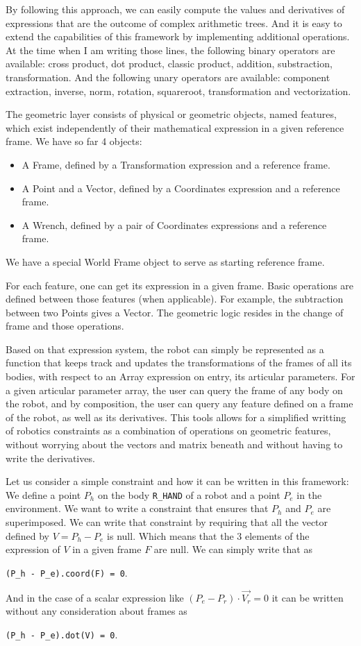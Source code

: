 By following this approach, we can easily compute the values and derivatives of expressions that are the outcome of complex arithmetic trees.
And it is easy to extend the capabilities of this framework by implementing additional operations.
At the time when I am writing those lines, the following binary operators are available: cross product, dot product, classic product, addition, substraction, transformation.
And the following unary operators are available: component extraction, inverse, norm, rotation, squareroot, transformation and vectorization.

The geometric layer consists of physical or geometric objects, named features, which exist independently of their mathematical expression in a given reference frame.
We have so far 4 objects:
\begin{itemize}
  \item A Frame, defined by a Transformation expression and a reference frame.
  \item A Point and a Vector, defined by a Coordinates expression and a reference frame.
  \item A Wrench, defined by a pair of Coordinates expressions and a reference frame.
\end{itemize}
We have a special World Frame object to serve as starting reference frame.

For each feature, one can get its expression in a given frame.
Basic operations are defined between those features (when applicable).
For example, the subtraction between two Points gives a Vector.
The geometric logic resides in the change of frame and those operations.

Based on that expression system, the robot can simply be represented as a function that keeps track and updates the transformations of the frames of all its bodies, with respect to an Array expression on entry, its articular parameters.
For a given articular parameter array, the user can query the frame of any body on the robot, and by composition, the user can query any feature defined on a frame of the robot, as well as its derivatives.
This tools allows for a simplified writting of robotics constraints as a combination of operations on geometric features, without worrying about the vectors and matrix beneath and without having to write the derivatives.

Let us consider a simple constraint and how it can be written in this framework:
We define a point $P_h$ on the body {\tt R\_HAND} of a robot and a point $P_e$ in the environment.
We want to write a constraint that ensures that $P_h$ and $P_e$ are superimposed.
We can write that constraint by requiring that all the vector defined by $V = P_h - P_e$ is null.
Which means that the 3 elements of the expression of $V$ in a given frame $F$ are null.
We can simply write that as
\begin{center}
{\tt(P\_h - P\_e).coord(F) = 0}.
\end{center}
And in the case of a scalar expression like $(P_e - P_r)\cdot \overrightarrow{V_r} = 0$ it can be written without any consideration about frames as
\begin{center}
{\tt(P\_h - P\_e).dot(V) = 0}.
\end{center}

